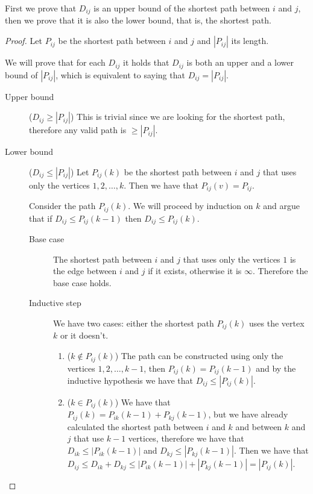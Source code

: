 \documentclass[14pt]{extarticle}
\begin{document}
First we prove that $D_{ij}$ is an upper bound of the shortest path between $i$ and $j$, then we prove that it is also the lower bound, that is, the shortest path.

\begin{proof}
    Let $P_{ij}$ be the shortest path between $i$ and $j$ and $|P_{ij}|$ its length.

    We will prove that for each $D_{ij}$ it holds that $D_{ij}$ is both an upper and a lower bound of $|P_{ij}|$, which is equivalent to saying that $D_{ij} = |P_{ij}|$.
    \begin{description}
        \item[Upper bound] ($D_{ij} \geq |P_{ij}|$)
            This is trivial since we are looking for the shortest path, therefore any valid path is $\geq |P_{ij}|$.
        \item[Lower bound] ($D_{ij} \leq |P_{ij}|$)
            Let $P_{ij}(k)$ be the shortest path between $i$ and $j$ that uses only the vertices $1, 2, \ldots, k$.
            Then we have that $P_{ij}(v) = P_{ij}$.

            Consider the path $P_{ij}(k)$.
            We will proceed by induction on $k$ and argue that if $D_{ij} \leq P_{ij}(k-1)$ then $D_{ij} \leq P_{ij}(k)$.

            \begin{description}
                \item[Base case] The shortest path between $i$ and $j$ that uses only the vertices $1$ is the edge between $i$ and $j$ if it exists, otherwise it is $\infty$. Therefore the base case holds.
                \item[Inductive step]
                    We have two cases: either the shortest path $P_{ij}(k)$ uses the vertex $k$ or it doesn't.

                    \begin{enumerate}[label=\roman*.]
                        \item ($k \notin P_{ij}(k)$)
                              The path can be constructed using only the vertices $1, 2, \ldots, k-1$, then $P_{ij}(k) = P_{ij}(k-1)$ and by the inductive hypothesis we have that $D_{ij} \leq |P_{ij}(k)|$.

                        \item ($k \in P_{ij}(k)$)
                              We have that $P_{ij}(k) = P_{ik}(k-1) + P_{kj}(k-1)$, but we have already calculated the shortest path between $i$ and $k$ and between $k$ and $j$ that use $k-1$ vertices, therefore we have that $D_{ik} \leq |P_{ik}(k-1)|$ and $D_{kj} \leq |P_{kj}(k-1)|$.
                              Then we have that $D_{ij} \leq D_{ik} + D_{kj} \leq |P_{ik}(k-1)| + |P_{kj}(k-1)| = |P_{ij}(k)|$.


\end{enumerate}
\end{description}
\end{description}
\end{proof}
\end{document}
